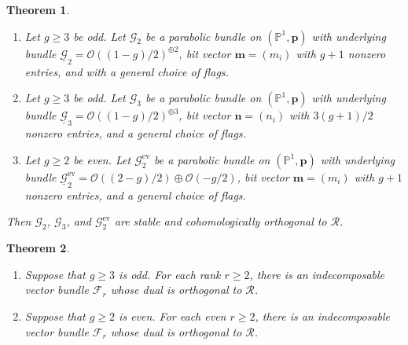 \documentclass[10pt,a4paper]{amsart}
\newtheorem{theorem}{Theorem}
\newcommand{\PP}{\mathbb{P} }
\newcommand{\bm}{\mathbf{m} }
\newcommand{\bn}{\mathbf{n} }
\newcommand{\bp}{\mathbf{p} }
\newcommand{\cF}{\mathcal{F} }
\newcommand{\cG}{\mathcal{G} }
\newcommand{\cO}{\mathcal{O} }
\newcommand{\cR}{\mathcal{R} }
\begin{document}
\begin{theorem}\label{thm:initialconst}
\begin{enumerate}
  \item Let \(g \ge 3\) be odd. Let \(\cG_2\) be a parabolic bundle on \((\PP^1, \bp)\) with underlying bundle \(\underline{\cG}_2 = \cO((1-g)/2)^{\oplus 2}\), bit vector \(\bm=(m_i)\) with \(g+1\) nonzero entries, and with a general choice of flags.
  \item Let \(g \ge 3\) be odd. Let \(\cG_3\) be a parabolic bundle on \((\PP^1, \bp)\) with underlying bundle \(\underline{\cG}_3 = \cO((1-g)/2)^{\oplus 3}\), bit vector \(\bn=(n_i)\) with \(3(g+1)/2\) nonzero entries, and a general choice of flags.
  \item Let \(g \ge 2\) be even. Let \(\cG_2^{\mathrm{ev}}\) be a parabolic bundle on \((\PP^1, \bp)\) with underlying bundle \(\underline{\cG}_2^{\mathrm{ev}} = \cO((2-g)/2)\oplus \cO(-g/2)\), bit vector \(\bm=(m_i)\) with \(g+1\) nonzero entries, and a general choice of flags.
\end{enumerate}
Then \(\cG_2\), \(\cG_3\), and \(\cG_2^{\mathrm{ev}}\) are stable and cohomologically orthogonal to \(\cR\).
\end{theorem}

\begin{theorem}\label{thm:maintheoremoddconditional}
\begin{enumerate}
  \item Suppose that \(g \ge 3\) is odd. For each rank \(r \ge 2\), there is an indecomposable vector bundle \(\cF_r\) whose dual is orthogonal to \(\cR\).
  \item Suppose that \(g \ge 2\) is even. For each even \(r \ge 2\), there is an indecomposable vector bundle \(\cF_r\) whose dual is orthogonal to \(\cR\).
\end{enumerate}
\end{theorem}
\end{document}
